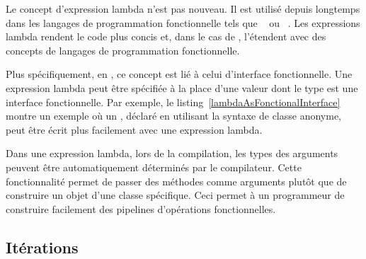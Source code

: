 
Le concept d'expression lambda n'est pas nouveau. Il est utilis\'e depuis longtemps dans les langages de programmation fonctionnelle tels que ~\citep{Steele84} ou ~\citep{HudakWad90,hutton2016programming}.
%
Les expressions lambda rendent le code plus concis et, dans le cas de , l'\'etendent avec des concepts de langages de programmation fonctionnelle. 

Plus sp\'ecifiquement, en , ce concept est li\'e \`a celui d'interface fonctionnelle. Une expression lambda peut \^etre sp\'ecifi\'ee \`a la place d'une valeur dont le type est une interface fonctionnelle. Par exemple, le listing~\ref{lambdaAsFonctionalInterface} montre un exemple o\`u un , d\'eclar\'e en utilisant la syntaxe de classe anonyme, peut \^etre \'ecrit plus facilement avec une expression lambda.

Dans une expression lambda, lors de la compilation, les types des arguments peuvent \^etre automatiquement d\'etermin\'es par le compilateur. Cette fonctionnalit\'e permet de passer des m\'ethodes comme arguments plut\^ot que de construire un objet d'une classe sp\'ecifique. Ceci permet \`a un programmeur de construire facilement des pipelines d'op\'erations fonctionnelles.


\subsection{It\'erations}


